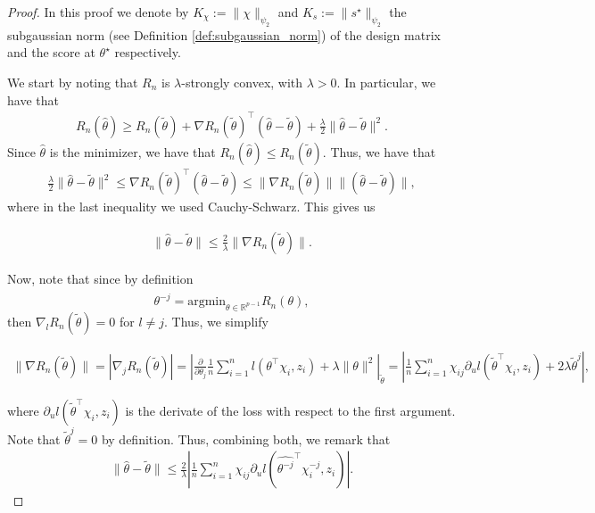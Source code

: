 \documentclass{article}
\theoremstyle{plain}
\theoremstyle{definition}
\theoremstyle{remark}
\begin{document}
\begin{proof}
 
 In this proof we denote by $K_\chi:=\|\chi\|_{\psi_2}$ and $K_s:=\|s^\star\|_{\psi_2}$ the subgaussian norm (see Definition \ref{def:subgaussian_norm}) of the design matrix and the score at $\theta^\star$ respectively. 
 
 We start by noting that $R_n$ is $\lambda$-strongly convex, with $\lambda>0$. In particular, we have that 
 \begin{align*}
     R_n(\widehat{\theta})\geq R_n(\widetilde{\theta})+\nabla R_n(\widetilde{\theta})^\top (\widehat{\theta}-\widetilde{\theta})+\frac{\lambda}{2}\|\widehat{\theta}-\widetilde{\theta}\|^2.
 \end{align*}
 Since $\widehat{\theta}$ is the minimizer, we have that $R_n(\widehat{\theta})\leq R_n(\widetilde{\theta})$. Thus, we have that
 \begin{align*}
     \frac{\lambda}{2}\|\widehat{\theta}-\widetilde{\theta}\|^2\leq \nabla R_n(\widetilde{\theta})^\top (\widehat{\theta}-\widetilde{\theta})\leq \|\nabla R_n(\widetilde{\theta})\|\| (\widehat{\theta}-\widetilde{\theta})\|,
 \end{align*}
 where in the last inequality we used Cauchy-Schwarz. This gives us 
 
 \begin{align*}
     \|\widehat{\theta}-\widetilde{\theta}\|\leq \frac{2}{\lambda} \|\nabla R_n(\widetilde{\theta})\|.
 \end{align*}
 
 Now, note that since by definition $$\widehat{\theta^{-j}}=\mathrm{argmin}_{\theta\in \mathbb{R}^{p-1}}R_n(\theta),$$ then $\nabla_l R_n(\widetilde{\theta})=0$ for $l\neq j$. Thus, we simplify 
 
 \begin{align*}
     \|\nabla R_n(\widetilde{\theta})\|=|\nabla_j R_n(\widetilde{\theta})|=\left|\frac{\partial}{\partial \theta_j}\frac{1}{n}\sum_{i=1}^n l(\theta^\top \chi_i, z_i)+\lambda \|\theta\|^2\right|_{\widetilde{\theta}}=\left|\frac{1}{n}\sum_{i=1}^n \chi_{ij}\partial_u l(\widetilde{\theta}^\top \chi_i, z_i)+2\lambda \widetilde{\theta}^j\right|,
 \end{align*}
 
 where $\partial_u l(\widetilde{\theta}^\top \chi_i, z_i)$ is the derivate of the loss with respect to the first argument. Note that $\widetilde{\theta}^j=0$ by definition.
 Thus, combining both, we remark that 
 \begin{align}\label{eq:first_decomp}
      \|\widehat{\theta}-\widetilde{\theta}\|\leq \frac{2}{\lambda} \left|\frac{1}{n}\sum_{i=1}^n \chi_{ij}\partial_u l(\widehat{\theta^{-j}}^\top \chi_i^{-j}, z_i)\right|.
 \end{align}
 

\end{proof}
\end{document}
